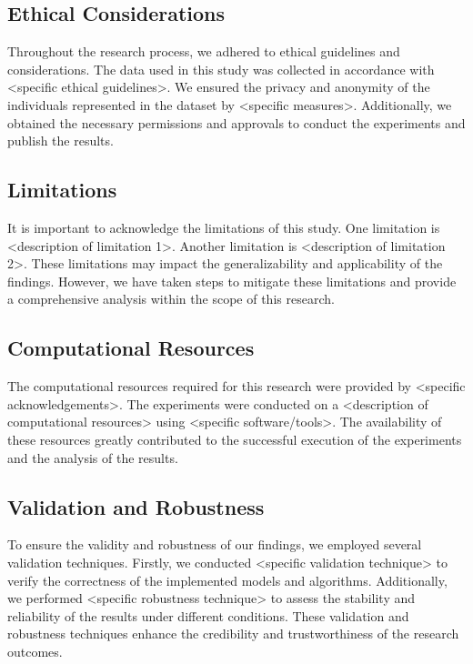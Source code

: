 \documentclass{article}
\begin{document}
\subsection{Ethical Considerations}

Throughout the research process, we adhered to ethical guidelines and considerations. The data used in this study was collected in accordance with <specific ethical guidelines>. We ensured the privacy and anonymity of the individuals represented in the dataset by <specific measures>. Additionally, we obtained the necessary permissions and approvals to conduct the experiments and publish the results.

\subsection{Limitations}

It is important to acknowledge the limitations of this study. One limitation is <description of limitation 1>. Another limitation is <description of limitation 2>. These limitations may impact the generalizability and applicability of the findings. However, we have taken steps to mitigate these limitations and provide a comprehensive analysis within the scope of this research.

\subsection{Computational Resources}

The computational resources required for this research were provided by <specific acknowledgements>. The experiments were conducted on a <description of computational resources> using <specific software/tools>. The availability of these resources greatly contributed to the successful execution of the experiments and the analysis of the results.

\subsection{Validation and Robustness}

To ensure the validity and robustness of our findings, we employed several validation techniques. Firstly, we conducted <specific validation technique> to verify the correctness of the implemented models and algorithms. Additionally, we performed <specific robustness technique> to assess the stability and reliability of the results under different conditions. These validation and robustness techniques enhance the credibility and trustworthiness of the research outcomes.
\end{document}
